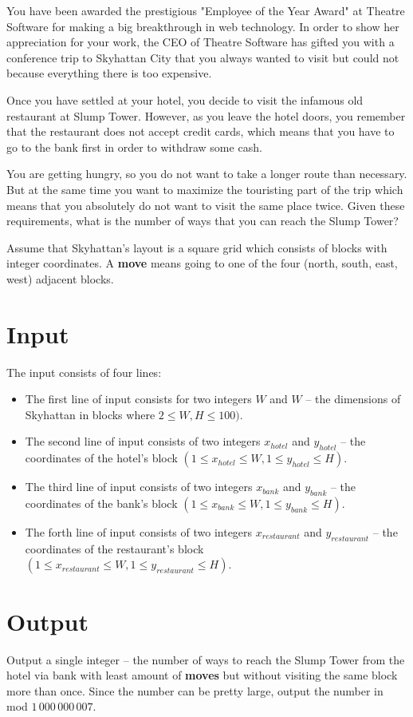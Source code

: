 You have been awarded the prestigious "Employee of the Year Award" at Theatre Software for making a big breakthrough in web technology.
In order to show her appreciation for your work, the CEO of Theatre Software has gifted you with a conference trip to Skyhattan City that you always wanted to visit but could not because everything there is too expensive.

Once you have settled at your hotel, you decide to visit the infamous old restaurant at Slump Tower.
However, as you leave the hotel doors, you remember that the restaurant does not accept credit cards, which means that you have to go to the bank first in order to withdraw some cash.

You are getting hungry, so you do not want to take a longer route than necessary.
But at the same time you want to maximize the touristing part of the trip which means that you absolutely do not want to visit the same place twice.
Given these requirements, what is the number of ways that you can reach the Slump Tower?

Assume that Skyhattan's layout is a square grid which consists of blocks with integer coordinates.
A \textbf{move} means going to one of the four (north, south, east, west) adjacent blocks.

\section*{Input}
The input consists of four lines:
\begin{itemize}

\item The first line of input consists for two integers $W$ and $W$ -- the dimensions of Skyhattan in blocks where $2 \leq W, H  \leq 100)$.

\item The second line of input consists of two integers $x_{hotel}$ and $y_{hotel}$ -- the coordinates of the hotel's block $(1 \leq x_{hotel} \leq W, 1 \leq y_{hotel} \leq H)$.

\item The third line of input consists of two integers $x_{bank}$ and $y_{bank}$ -- the coordinates of the bank's block $(1 \leq x_{bank} \leq W, 1 \leq y_{bank} \leq H)$.

\item The forth line of input consists of two integers $x_{restaurant}$ and $y_{restaurant}$ -- the coordinates of the restaurant's block $(1 \leq x_{restaurant} \leq W, 1 \leq y_{restaurant} \leq H)$.

\end{itemize}

\section*{Output}
Output a single integer -- the number of ways to reach the Slump Tower from the hotel via bank with least amount of \textbf{moves} but without visiting the same block more than once. Since the number can be pretty large, output the number in mod $1\,000\,000\,007$.

